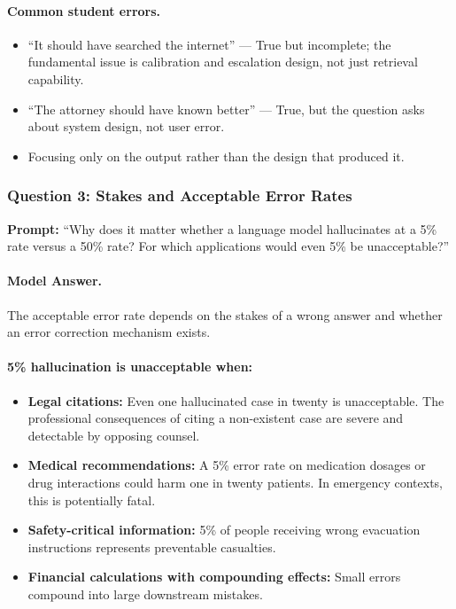 \paragraph{Common student errors.}
\begin{itemize}
    \item ``It should have searched the internet'' --- True but incomplete; the fundamental issue is calibration and escalation design, not just retrieval capability.
    \item ``The attorney should have known better'' --- True, but the question asks about system design, not user error.
    \item Focusing only on the output rather than the design that produced it.
\end{itemize}

\subsubsection{Question 3: Stakes and Acceptable Error Rates}

\textbf{Prompt:} ``Why does it matter whether a language model hallucinates at a 5\% rate versus a 50\% rate? For which applications would even 5\% be unacceptable?''

\paragraph{Model Answer.}

The acceptable error rate depends on the stakes of a wrong answer and whether an error correction mechanism exists.

\paragraph{5\% hallucination is unacceptable when:}
\begin{itemize}
    \item \textbf{Legal citations:} Even one hallucinated case in twenty is unacceptable. The professional consequences of citing a non-existent case are severe and detectable by opposing counsel.
    \item \textbf{Medical recommendations:} A 5\% error rate on medication dosages or drug interactions could harm one in twenty patients. In emergency contexts, this is potentially fatal.
    \item \textbf{Safety-critical information:} 5\% of people receiving wrong evacuation instructions represents preventable casualties.
    \item \textbf{Financial calculations with compounding effects:} Small errors compound into large downstream mistakes.
\end{itemize}


